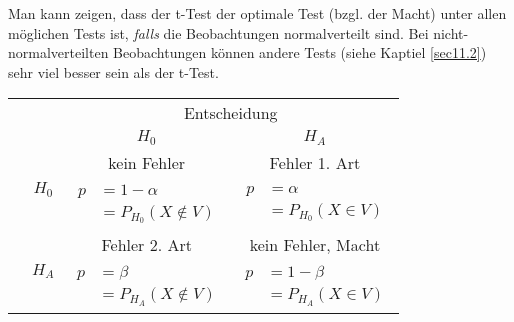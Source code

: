Man kann zeigen, dass der t-Test der optimale Test (bzgl. der Macht) unter allen möglichen Tests ist, \emph{falls} die Beobachtungen normalverteilt sind. Bei nicht-normalverteilten Beobachtungen können andere Tests (siehe Kaptiel \ref{sec11.2}) sehr viel besser sein als der t-Test.\\[1em]
\begin{tabular}[pos=ttcc]{cc|c|c|}
	\multicolumn{2}{c}{}&\multicolumn{2}{c}{Entscheidung}\\
	&\multicolumn{1}{c}{}&\multicolumn{1}{c}{$H_0$}&\multicolumn{1}{c}{$H_A$}\\
	\cline{3-4}
	\multirow{6}{*}{\rotatebox[]{90}{Wahrheit\quad}}\!\!\!&\multirow{3}{*}{$H_0$}\!\!&kein Fehler&Fehler 1. Art\\
	&&\multirow{2}{*}{$\!\begin{aligned}p&=1-\alpha\\&=P_{H_0}(X\not\in V) \end{aligned}\!$}&\multirow{2}{*}{$\!\begin{aligned}p&=\alpha\\&=P_{H_0}(X\in V) \end{aligned}\!$}\\[1ex]
	&&&\\
	\cline{3-4}
	&\multirow{3}{*}{$H_A$}\!\!&Fehler 2. Art&kein Fehler, Macht\\
	&&\multirow{2}{*}{$\!\begin{aligned}p&=\beta\\&=P_{H_A}(X\not\in V) \end{aligned}\!$}&\multirow{2}{*}{$\!\begin{aligned}p&=1-\beta\\&=P_{H_A}(X\in V) \end{aligned}\!$}\\[1ex]
	&&&\\
	\cline{3-4}
\end{tabular}

